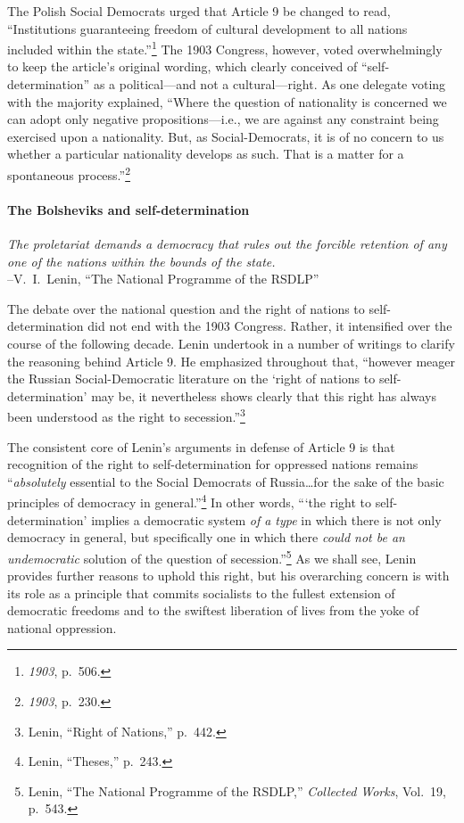 The Polish Social Democrats urged that Article 9 be changed to read, ``Institutions guaranteeing freedom of cultural development to all nations included within the state.''\footnote{\emph{1903}, p.\ 506.} The 1903 Congress, however, voted overwhelmingly to keep the article's original wording, which clearly conceived of ``self-determination'' as a political---and not a cultural---right. As one delegate voting with the majority explained, ``Where the question of nationality is concerned we can adopt only negative propositions---i.e., we are against any constraint being exercised upon a nationality. But, as Social-Democrats, it is of no concern to us whether a particular nationality develops as such. That is a matter for a spontaneous process.''\footnote{\emph{1903}, p.\ 230.}

\paragraph{The Bolsheviks and self-determination}

\begin{flushleft}\emph{The proletariat demands a democracy that rules out the forcible retention of any one of the nations within the bounds of the state.}\\
--V.\ I.\ Lenin, ``The National Programme of the RSDLP''
\end{flushleft}

The debate over the national question and the right of nations to self-determination did not end with the 1903 Congress. Rather, it intensified over the course of the following decade. Lenin undertook in a number of writings to clarify the reasoning behind Article 9. He emphasized throughout that, ``however meager the Russian Social-Democratic literature on the `right of nations to self-determination' may be, it nevertheless shows clearly that this right has always been understood as the right to secession.''\footnote{Lenin, ``Right of Nations,'' p.\ 442.}

The consistent core of Lenin's arguments in defense of Article 9 is that recognition of the right to self-determination for oppressed nations remains ``\emph{absolutely} essential to the Social Democrats of Russia\ldots for the sake of the basic principles of democracy in general.''\footnote{Lenin, ``Theses,'' p.\ 243.} In other words, ```the right to self-determination' implies a democratic system \emph{of a type} in which there is not only democracy in general, but specifically one in which there \emph{could not be an undemocratic} solution of the question of secession.''\footnote{Lenin, ``The National Programme of the RSDLP,'' \emph{Collected Works}, Vol.\ 19, p.\ 543.} As we shall see, Lenin provides further reasons to uphold this right, but his overarching concern is with its role as a principle that commits socialists to the fullest extension of democratic freedoms and to the swiftest liberation of lives from the yoke of national oppression.

